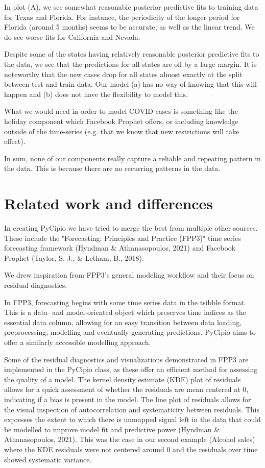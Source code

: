 \documentclass{article}
\begin{document}
In plot (A), we see somewhat reasonable posterior predictive fits to training data for Texas and Florida. For instance, the periodicity of the longer period for Florida (around 5 months) seems to be accurate, as well as the linear trend. We do see worse fits for California and Nevada. 

Despite some of the states having relatively reasonable posterior predictive fits to the data, we see that the predictions for all states are off by a large margin. It is noteworthy that the new cases drop for all states almost exactly at the split between test and train data. Our model (a) has no way of knowing that this will happen and (b) does not have the flexibility to model this. 

What we would need in order to model COVID cases is something like the holiday component which Facebook Prophet offers, or including knowledge outside of the time-series (e.g. that we know that new restrictions will take effect). 

In sum, none of our components really capture a reliable and repeating pattern in the data. This is because there are no recurring patterns in the data. 


\section{Related work and differences}

In creating PyCipio we have tried to merge the best from multiple other sources. These include the "Forecasting: Principles and Practice (FPP3)" time series forecasting framework (Hyndman \& Athanasopoulos, 2021) and Facebook Prophet (Taylor, S. J., \& Letham, B., 2018).

We drew inspiration from FPP3’s general modeling workflow and their focus on residual diagnostics. 

In FPP3, forecasting begins with some time series data in the tsibble format. This is a data- and model-oriented object which preserves time indices as the essential data column, allowing for an easy transition between data loading, preprocessing, modelling and eventually generating predictions. PyCipio aims to offer a similarly accessible modelling approach. 

Some of the residual diagnostics and visualizations demonstrated in FPP3 are implemented in the PyCipio class, as these offer an efficient method for assessing the quality of a model.
The kernel density estimate (KDE) plot of residuals allows for a quick assessment of whether the residuals are mean centered at 0, indicating if a bias is present in the model. The line plot of residuals allows for the visual inspection of autocorrelation and systematicity between residuals. This expresses the extent to which there is unmapped signal left in the data that could be modelled to improve model fit and predictive power (Hyndman \& Athanasopoulos, 2021). This was the case in our second example (Alcohol sales) where the KDE residuals were not centered around 0 and the residuals over time showed systematic variance. 
\end{document}
